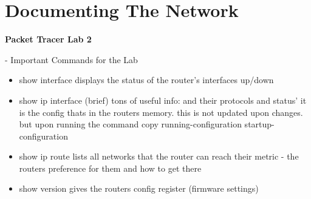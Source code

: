 \documentclass[../EngineeringJournal_CDavis.tex]{subfiles}
\begin{document}

\chapter[Documenting The Network]{Documenting \linebreak[1] The Network \hspace*{\fill}{Jan 26, 2020}}
\noindent\textbf{{Packet Tracer Lab 2} }                             

\hspace{0.2cm}
\begin{tcolorbox}[width=6.3in]
\scriptsize 
- Important Commands for the Lab
  \begin{itemize}
	\item{show interface} displays the status of the router's interfaces
	   up/down
	\item{show ip interface (brief)} tons of useful info:
	   and their protocols and status'
	  \subitem{} it is the config thats in the routers memory.
	   this is not updated upon changes. but upon running the command copy running-configuration startup-configuration
	\item{show ip route} 
	  \subitem{}lists all networks that the router can reach 
	  \subitem{}their metric - the routers preference for them and how to get there
	\item{show version} gives the routers config register (firmware settings)
  \end{itemize}
\normalsize  
\end{tcolorbox}
\hspace{0.2cm}

\newpage
\end{document}
